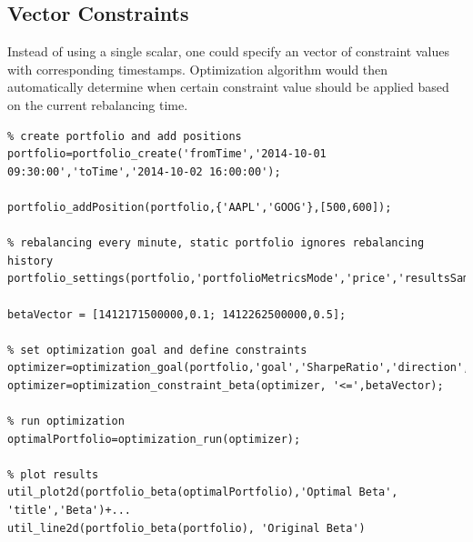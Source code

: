 \documentclass[letterpaper]{report}
\begin{document}
\subsection{Vector Constraints}
Instead of using a single scalar, one could specify an vector of constraint values with corresponding timestamps. 
Optimization algorithm would then automatically determine when certain constraint value should be applied based on the current rebalancing time.

\begin{lstlisting}
% create portfolio and add positions
portfolio=portfolio_create('fromTime','2014-10-01 09:30:00','toTime','2014-10-02 16:00:00');

portfolio_addPosition(portfolio,{'AAPL','GOOG'},[500,600]);

% rebalancing every minute, static portfolio ignores rebalancing history
portfolio_settings(portfolio,'portfolioMetricsMode','price','resultsSamplingInterval','30m');

betaVector = [1412171500000,0.1; 1412262500000,0.5];

% set optimization goal and define constraints
optimizer=optimization_goal(portfolio,'goal','SharpeRatio','direction','maximize');
optimizer=optimization_constraint_beta(optimizer, '<=',betaVector);

% run optimization
optimalPortfolio=optimization_run(optimizer);

% plot results
util_plot2d(portfolio_beta(optimalPortfolio),'Optimal Beta', 'title','Beta')+...
util_line2d(portfolio_beta(portfolio), 'Original Beta')
\end{lstlisting}
\end{document}
